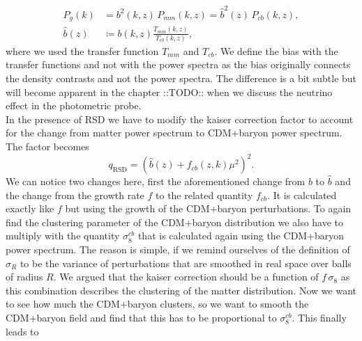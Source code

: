 \documentclass[oneside]{book}
\newcommand*{\marktodo}{{\color{mmcol} ::TODO::}\xspace}
\begin{document}
\begin{align}
    P_g(k) &= b^2(k,z)\, P_{mm}(k,z) = \hat{b}^2(z)\, P_{cb}(k,z),\\
    \hat{b}(z) &\coloneq b(k,z) \frac{T_{mm}(k,z)}{T_{cb}(k,z)} \nonumber,
\end{align}
where we used the transfer function $T_{mm}$ and $T_{cb}$. We define the bias with the transfer functions and not with the power spectra as the bias originally connects the density contrasts and not the power spectra. The difference is a bit subtle but will become apparent in the chapter \marktodo when we discuss the neutrino effect in the photometric probe.\\
In the presence of RSD we have to modify the kaiser correction factor to account for the change from matter power spectrum to CDM+baryon power spectrum. The factor becomes \begin{equation}
    q_\mathrm{RSD} = \left(\hat{b}(z)+f_{cb}(z,k)\mu^2\right)^2.
\end{equation}
We can notice two changes here, first the aforementioned change from $b$ to $\hat{b}$ and the change from the growth rate $f$ to the related quantity $f_{cb}$. It is calculated exactly like $f$ but using the growth of the CDM+baryon perturbations. To again find the clustering parameter of the CDM+baryon distribution we also have to multiply with the quantity $\sigma_8^{cb}$ that is calculated again using the CDM+baryon power spectrum. The reason is simple, if we remind ourselves of the definition of $\sigma_R$ to be the variance of perturbations that are smoothed in real space over balls of radius $R$. We argued that the kaiser correction should be a function of $f\,\sigma_8$ as this combination describes the clustering of the matter distribution. Now we want to see how much the CDM+baryon clusters, so we want to smooth the CDM+baryon field and find that this has to be proportional to $\sigma_8^{cb}$. This finally leads to 
\end{document}
